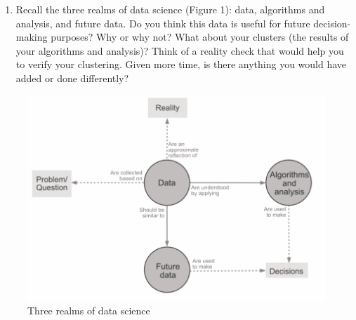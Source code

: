 \documentclass[letterpaper,12pt]{article}
\begin{document}
\begin{enumerate}
    \item Recall the three realms of data science (Figure 1): data, algorithms and analysis, and future data. Do you think this data is useful for future decision-making purposes? Why or why not? What about your clusters (the results of your algorithms and analysis)? Think of a reality check that would help you to verify your clustering. Given more time, is there anything you would have added or done differently?
\end{enumerate}

\printbibliography

\begin{figure}
    \centering
    \includegraphics[width=\textwidth]{threerealms.png}
    \caption{Three realms of data science}
\end{figure}
\end{document}
